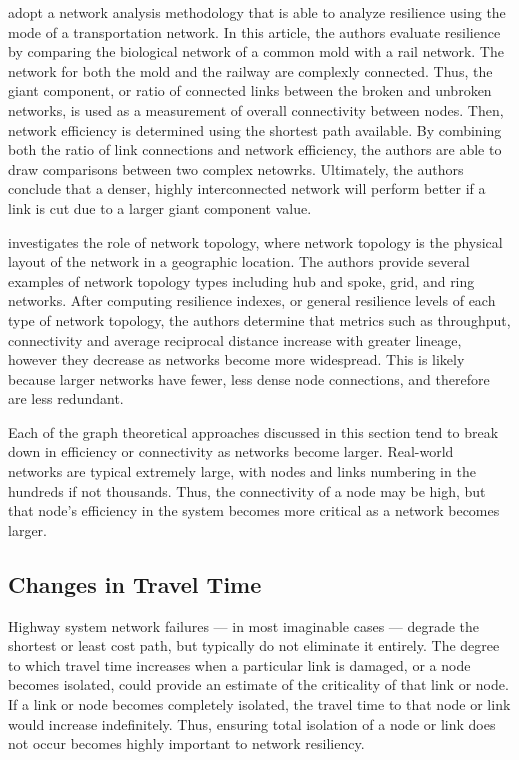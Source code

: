 \citet{osei2014} adopt a network analysis methodology that is able to
analyze
resilience using the mode of a transportation network. In this
article, the authors evaluate resilience by comparing the biological
network of a common mold
with a rail network. The network for both the mold and the railway are complexly connected. Thus, the giant component, or ratio of connected links between the broken and unbroken networks, is used as a measurement of overall connectivity between nodes. Then, network efficiency is determined using the shortest path available. By combining both the ratio of link connections and network efficiency, the authors are able to draw comparisons between two complex netowrks. Ultimately, the authors conclude that a denser, highly interconnected network will perform better if a link is cut due to a larger giant component value.

\citet{zhang2015.2} investigates the role of network topology, where network topology is the physical layout of the network in a geographic location.
The authors provide several examples of network topology types including
hub and spoke, grid, and
ring networks. After computing resilience indexes, or general resilience
levels of each type of
network topology, the authors determine that metrics such as throughput,
connectivity and average
reciprocal distance increase with greater lineage, however they decrease as
networks become
more widespread. This is likely because larger networks have fewer, less dense node
connections, and
therefore are less redundant.

Each of the graph theoretical approaches discussed in this section tend to break down in efficiency or connectivity as networks become larger. Real-world networks are typical extremely large, with nodes and links numbering in the hundreds if not thousands. Thus, the connectivity of a node may be high, but that node's efficiency in the system becomes more critical as a network becomes larger.

\subsection{Changes in Travel Time}

Highway system network failures --- in most imaginable cases --- degrade
the
shortest or least cost path, but typically do not eliminate it entirely.
The degree
to which travel time increases when a particular link is damaged, or a node becomes isolated, could
provide an estimate of the criticality of that link or node. If a link or node becomes completely isolated, the travel time to that node or link would increase indefinitely. Thus, ensuring total isolation of a node or link does not occur becomes highly important to network resiliency.

